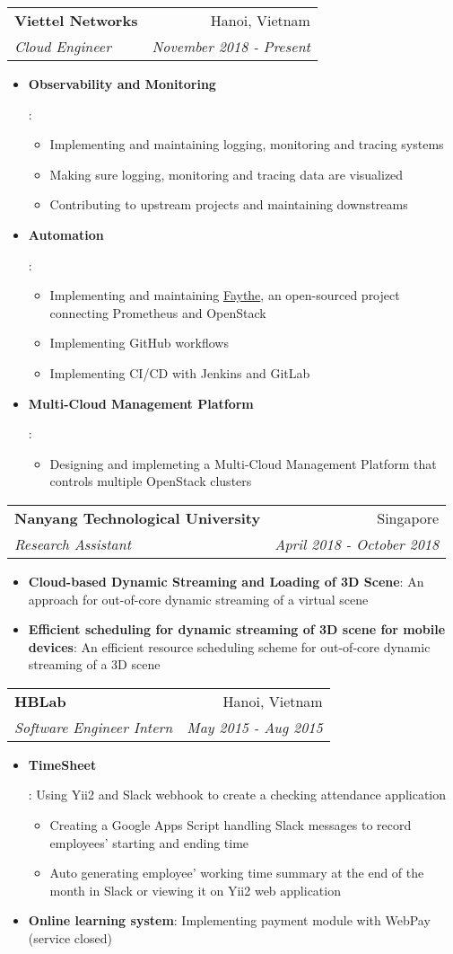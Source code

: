\documentclass[letterpaper,10pt]{article}
\makeatletter
\newcommand{\resumeItem}[2]{
  \item\small{
    \textbf{#1}{: #2 \vspace{-2pt}}
  }
}
\newcommand{\resumeSubheading}[4]{
  \vspace{-1pt}\item[]
  \begin{tabular*}{0.98\textwidth}{l@{\extracolsep{\fill}}r}
      \hspace{-10pt}\textbf{#1} & #2 \\
      \hspace{-10pt}\textit{\small#3} & \textit{\small #4} \\
    \end{tabular*}\vspace{-5pt}
}
\newcommand{\resumeItemListStart}{\begin{itemize}}
\newcommand{\resumeItemListEnd}{\end{itemize}\vspace{-5pt}}
\makeatother
\begin{document}
    \resumeSubheading
      {Viettel Networks}{Hanoi, Vietnam}
      {Cloud Engineer}{November 2018 - Present}
      \resumeItemListStart
        \resumeItem{Observability and Monitoring}
          {
            \begin{itemize}
                \item Implementing and maintaining logging, monitoring and tracing systems
                \item Making sure logging, monitoring and tracing data are visualized
                \item Contributing to upstream projects and maintaining downstreams
            \end{itemize}
          }
        \resumeItem{Automation}
          {
            \begin{itemize}
                \item Implementing and maintaining \href{https://github.com/vCloud-DFTBA/faythe}{Faythe}, an open-sourced project connecting Prometheus and OpenStack
                \item Implementing GitHub workflows
                \item Implementing CI/CD with Jenkins and GitLab
            \end{itemize}
          }
        \resumeItem{Multi-Cloud Management Platform}
          {
            \begin{itemize}
                \item Designing and implemeting a Multi-Cloud Management Platform that controls multiple OpenStack clusters
            \end{itemize}
          }
      \resumeItemListEnd

    \resumeSubheading
      {Nanyang Technological University}{Singapore}
      {Research Assistant}{April 2018 - October 2018}
      \resumeItemListStart
        \resumeItem{Cloud-based Dynamic Streaming and Loading of 3D Scene}
          {An approach for out-of-core dynamic streaming of a virtual scene
          }
      \resumeItem{Efficient scheduling for dynamic streaming of 3D scene for mobile devices}
      {An efficient resource scheduling scheme for out-of-core dynamic streaming of a 3D scene
      }
      \resumeItemListEnd

    \resumeSubheading
      {HBLab}{Hanoi, Vietnam}
      {Software Engineer Intern}{May 2015 - Aug 2015}
      \resumeItemListStart
        \resumeItem{TimeSheet}
        {Using Yii2 and Slack webhook to create a checking attendance application
          \begin{itemize}
          	\item Creating a Google Apps Script handling Slack messages to record employees' starting and ending time
          	\item Auto generating employee' working time summary at the end of the month in Slack or viewing it on Yii2 web application
          \end{itemize}
      	}
      \resumeItem{Online learning system}
      {Implementing payment module with WebPay (service closed)}
      \resumeItemListEnd
\end{document}
